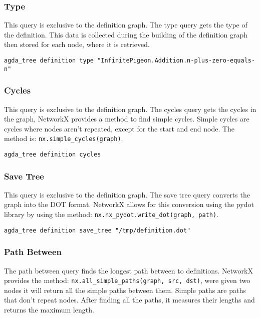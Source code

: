 \subsubsection{Type}

This query is exclusive to the definition graph. The type query gets
the type of the definition. This data is collected during the building of the
definition graph then stored for each node, where it is retrieved.

\begin{lstlisting}
agda_tree definition type "InfinitePigeon.Addition.n-plus-zero-equals-n"
\end{lstlisting}

\subsubsection{Cycles}

This query is exclusive to the definition graph. The cycles query gets the
cycles in the graph, NetworkX provides a method to find simple cycles. Simple
cycles are cycles where nodes aren't repeated, except for the start and end
node. The method is: \texttt{nx.simple\_cycles(graph)}.

\begin{lstlisting}
agda_tree definition cycles
\end{lstlisting}

\subsubsection{Save Tree}

This query is exclusive to the definition graph. The save tree query converts
the graph into the DOT format. NetworkX allows for this conversion using the
pydot library by using the method: \texttt{nx.nx\_pydot.write\_dot(graph, path)}.

\begin{lstlisting}
agda_tree definition save_tree "/tmp/definition.dot"
\end{lstlisting}

\subsubsection{Path Between}

The path between query finds the longest path between to definitions. NetworkX
provides the method: \texttt{nx.all\_simple\_paths(graph, src, dst)}, were given
two nodes it will return all the simple paths between them. Simple paths are
paths that don't repeat nodes. After finding all the paths, it measures their
lengths and returns the maximum length.

